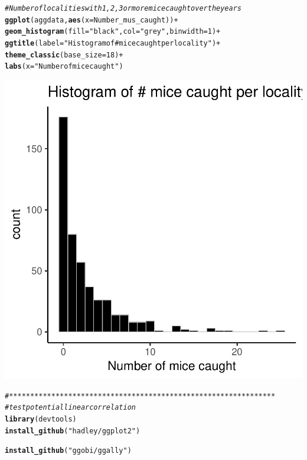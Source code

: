 \documentclass{article}\usepackage[]{graphicx}\usepackage[]{color}
\makeatletter
\newcommand{\hlnum}[1]{\textcolor[rgb]{0.686,0.059,0.569}{#1}}%
\newcommand{\hlstr}[1]{\textcolor[rgb]{0.192,0.494,0.8}{#1}}%
\newcommand{\hlcom}[1]{\textcolor[rgb]{0.678,0.584,0.686}{\textit{#1}}}%
\newcommand{\hlopt}[1]{\textcolor[rgb]{0,0,0}{#1}}%
\newcommand{\hlstd}[1]{\textcolor[rgb]{0.345,0.345,0.345}{#1}}%
\newcommand{\hlkwc}[1]{\textcolor[rgb]{0.333,0.667,0.333}{#1}}%
\newcommand{\hlkwd}[1]{\textcolor[rgb]{0.737,0.353,0.396}{\textbf{#1}}}%
\newenvironment{kframe}{%
 \def\at@end@of@kframe{}%
 \ifinner\ifhmode%
  \def\at@end@of@kframe{\end{minipage}}%
  \begin{minipage}{\columnwidth}%
 \fi\fi%
 \def\FrameCommand##1{\hskip\@totalleftmargin \hskip-\fboxsep
 \colorbox{shadecolor}{##1}\hskip-\fboxsep
     \hskip-\linewidth \hskip-\@totalleftmargin \hskip\columnwidth}%
 \MakeFramed {\advance\hsize-\width
   \@totalleftmargin\z@ \linewidth\hsize
   \@setminipage}}%
 {\par\unskip\endMakeFramed%
 \at@end@of@kframe}
\newenvironment{knitrout}{}{} %
\makeatother
\begin{document}
\begin{knitrout}
{}


\begin{kframe}\begin{alltt}
\hlcom{# Number of localities with 1, 2, 3 or more mice caught over the years}
\hlkwd{ggplot}\hlstd{(aggdata,} \hlkwd{aes}\hlstd{(}\hlkwc{x} \hlstd{= Number_mus_caught))} \hlopt{+}
  \hlkwd{geom_histogram}\hlstd{(}\hlkwc{fill}\hlstd{=}\hlstr{"black"}\hlstd{,} \hlkwc{col}\hlstd{=}\hlstr{"grey"}\hlstd{,} \hlkwc{binwidth} \hlstd{=} \hlnum{1}\hlstd{)} \hlopt{+}
  \hlkwd{ggtitle}\hlstd{(}\hlkwc{label} \hlstd{=} \hlstr{"Histogram of # mice caught per locality"}\hlstd{)}\hlopt{+}
  \hlkwd{theme_classic}\hlstd{(}\hlkwc{base_size} \hlstd{=} \hlnum{18}\hlstd{)} \hlopt{+}
  \hlkwd{labs}\hlstd{(}\hlkwc{x} \hlstd{=} \hlstr{"Number of mice caught"}\hlstd{)}
\end{alltt}
\end{kframe}

{\centering \includegraphics[width=.6\linewidth]{figure/Data-Analysis-Alice-2017-Rnwauto-report-4} 

}


\begin{kframe}\begin{alltt}
\hlcom{# ***************************************************************}
\hlcom{# test potential linear correlation}
\hlkwd{library}\hlstd{(devtools)}
\hlkwd{install_github}\hlstd{(}\hlstr{"hadley/ggplot2"}\hlstd{)}
\end{alltt}


{\ttfamily\noindent\itshape\color{messagecolor}{\#\# Skipping install of 'ggplot2' from a github remote, the SHA1 (582acfec) has not changed since last install.\\\#\#\ \  Use `force = TRUE` to force installation}}\begin{alltt}
\hlkwd{install_github}\hlstd{(}\hlstr{"ggobi/ggally"}\hlstd{)}
\end{alltt}



\end{kframe}
\end{knitrout}
\end{document}
